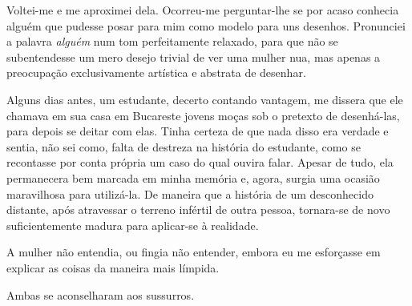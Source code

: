 
Voltei-me e me aproximei dela. Ocorreu-me perguntar-lhe se por acaso conhecia
alguém que pudesse posar para mim como modelo para uns desenhos. Pronunciei a
palavra \textit{alguém} num tom perfeitamente relaxado, para que não se
subentendesse um mero desejo trivial de ver uma mulher nua, mas apenas a
preocupação exclusivamente artística e abstrata de desenhar.

Alguns dias antes, um estudante, decerto contando vantagem, me dissera que ele
chamava em sua casa em Bucareste jovens moças sob o pretexto de desenhá-las,
para depois se deitar com elas. Tinha certeza de que nada disso era verdade e
sentia, não sei como, falta de destreza na história do estudante, como se
recontasse por conta própria um caso do qual ouvira falar. Apesar de tudo,
ela permanecera bem marcada em minha memória e, agora, surgia uma ocasião
maravilhosa para utilizá-la. De maneira que a história de um desconhecido
distante, após atravessar o terreno infértil de outra pessoa, tornara-se de
novo suficientemente madura para aplicar-se à realidade.

A mulher não entendia, ou fingia não entender, embora eu me esforçasse em
explicar as coisas da maneira mais límpida.


Ambas se aconselharam aos sussurros.




